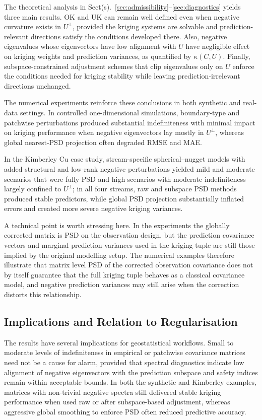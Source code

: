 \documentclass[smallextended]{svjour3}
\newcommand{\1}{\mathbf{1}}
\begin{document}
The theoretical analysis in Sect(s).~\ref{sec:admissibility}–\ref{sec:diagnostics} yields three main results. OK and UK can remain well defined even when negative curvature exists in $U^\perp$, provided the kriging systems are solvable and prediction-relevant directions satisfy the conditions developed there. Also, negative eigenvalues whose eigenvectors have low alignment with $U$ have negligible effect on kriging weights and prediction variances, as quantified by $\kappa(C,U)$. Finally, subspace-constrained adjustment schemes that clip eigenvalues only on $U$ enforce the conditions needed for kriging stability while leaving prediction-irrelevant directions unchanged.

The numerical experiments reinforce these conclusions in both synthetic and real-data settings. In controlled one-dimensional simulations, boundary-type and patchwise perturbations produced substantial indefiniteness with minimal impact on kriging performance when negative eigenvectors lay mostly in $U^\perp$, whereas global nearest-PSD projection often degraded RMSE and MAE. 

In the Kimberley Cu case study, stream-specific spherical–nugget models with added structural and low-rank negative perturbations yielded mild and moderate scenarios that were fully PSD and high scenarios with moderate indefiniteness largely confined to $U^\perp$; in all four streams, raw and subspace PSD methods produced stable predictors, while global PSD projection substantially inflated errors and created more severe negative kriging variances.

A technical point is worth stressing here. In the experiments the globally corrected matrix is PSD on the observation design, but the prediction covariance vectors and marginal prediction variances used in the kriging tuple are still those implied by the original modelling setup. The numerical examples therefore illustrate that matrix level PSD of the corrected observation covariance does not by itself guarantee that the full kriging tuple behaves as a classical covariance model, and negative prediction variances may still arise when the correction distorts this relationship.

\subsection{Implications and Relation to Regularisation}

The results have several implications for geostatistical workflows. Small to moderate levels of indefiniteness in empirical or patchwise covariance matrices need not be a cause for alarm, provided that spectral diagnostics indicate low alignment of negative eigenvectors with the prediction subspace and safety indices remain within acceptable bounds. In both the synthetic and Kimberley examples, matrices with non-trivial negative spectra still delivered stable kriging performance when used raw or after subspace-based
adjustment, whereas aggressive global smoothing to enforce PSD often reduced predictive accuracy.
\end{document}
